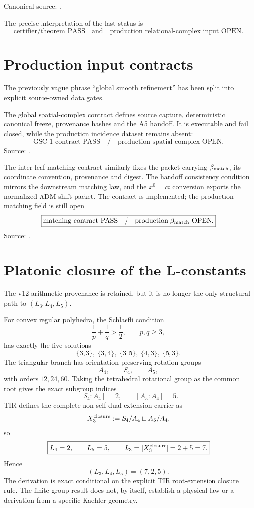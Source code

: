 Canonical source:
.

The precise interpretation of the last status is
\[
\boxed{
\text{certifier/theorem PASS}
\quad\text{and}\quad
\text{production relational-complex input OPEN}.
}
\]

\section{Production input contracts}

The previously vague phrase ``global smooth refinement'' has been split into
explicit source-owned data gates.

The global spatial-complex contract defines source capture, deterministic
canonical freeze, provenance hashes and the A5 handoff.  It is executable and
fail closed, while the production incidence dataset remains absent:
\[
\boxed{
\text{GSC-1 contract PASS}
\quad/\quad
\text{production spatial complex OPEN}.
}
\]
Source:
.

The inter-leaf matching contract similarly fixes the packet carrying
\(\beta_{\rm match}\), its coordinate convention, provenance and digest.  The
handoff consistency condition mirrors the downstream matching law, and the
\(x^0=ct\) conversion exports the normalized ADM-shift packet.  The contract is
implemented; the production matching field is still open:
\[
\boxed{
\text{matching contract PASS}
\quad/\quad
\text{production }\beta_{\rm match}\text{ OPEN}.
}
\]
Source:
.

\section{Platonic closure of the L-constants}

The v12 arithmetic provenance is retained, but it is no longer the only
structural path to \((L_3,L_4,L_5)\).

For convex regular polyhedra, the Schlaefli condition
\[
\frac1p+\frac1q>\frac12,
\qquad p,q\ge3,
\]
has exactly the five solutions
\[
\{3,3\},\ \{3,4\},\ \{3,5\},\ \{4,3\},\ \{5,3\}.
\]
The triangular branch has orientation-preserving rotation groups
\[
A_4,\qquad S_4,\qquad A_5,
\]
with orders \(12,24,60\).  Taking the tetrahedral rotational group as the
common root gives the exact subgroup indices
\[
\boxed{[S_4:A_4]=2},
\qquad
\boxed{[A_5:A_4]=5}.
\]
TIR defines the complete non-self-dual extension carrier as
\[
X_3^{\rm closure}
:=S_4/A_4\sqcup A_5/A_4,
\]
so
\[
\boxed{
L_4=2,
\qquad L_5=5,
\qquad L_3=|X_3^{\rm closure}|=2+5=7.
}
\]
Hence
\[
\boxed{(L_3,L_4,L_5)=(7,2,5)}.
\]
The derivation is exact conditional on the explicit TIR root-extension closure
rule.  The finite-group result does not, by itself, establish a physical law or
a derivation from a specific Kaehler geometry.

